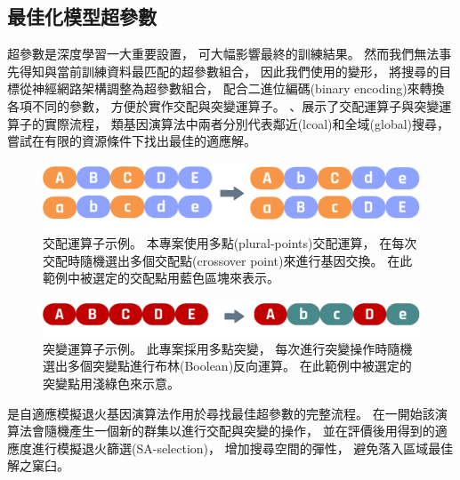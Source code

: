 \documentclass[a4paper,14pt]{extarticle}
\begin{document}
        \subsection{最佳化模型超參數}
            超參數是深度學習一大重要設置，
            可大幅影響最終的訓練結果。
            然而我們無法事先得知與當前訓練資料最匹配的超參數組合，
            因此我們使用的變形，
            將搜尋的目標從神經網路架構調整為超參數組合，
            配合二進位編碼(binary encoding)來轉換各項不同的參數，
            方便於實作交配與突變運算子。
            、展示了交配運算子與突變運算子的實際流程，
            類基因演算法中兩者分別代表鄰近(lcoal)和全域(global)搜尋，
            嘗試在有限的資源條件下找出最佳的適應解。
            \begin{figure}[htb]
                \centering
                \includegraphics[width=\textwidth]{crossover.pdf}
                \caption{
                    {\fontsize{12pt}{10pt}\selectfont
                        交配運算子示例。
                        本專案使用多點(plural-points)交配運算，
                        在每次交配時隨機選出多個交配點(crossover point)來進行基因交換。
                        在此範例中被選定的交配點用藍色區塊來表示。
                    }
                }
                \label{fig:crossover}
            \end{figure}
            \begin{figure}[htb]
                \centering
                \includegraphics[width=\textwidth]{mutation.pdf}
                \caption{
                    {\fontsize{12pt}{10pt}\selectfont
                        突變運算子示例。
                        此專案採用多點突變，
                        每次進行突變操作時隨機選出多個突變點進行布林(Boolean)反向運算。
                        在此範例中被選定的突變點用淺綠色來示意。
                    }
                }
                \label{fig:mutation}
            \end{figure}

            是自適應模擬退火基因演算法作用於尋找最佳超參數的完整流程。
            在一開始該演算法會隨機產生一個新的群集以進行交配與突變的操作，
            並在評價後用得到的適應度進行模擬退火篩選(SA-selection)，
            增加搜尋空間的彈性，
            避免落入區域最佳解之窠臼。
\end{document}
